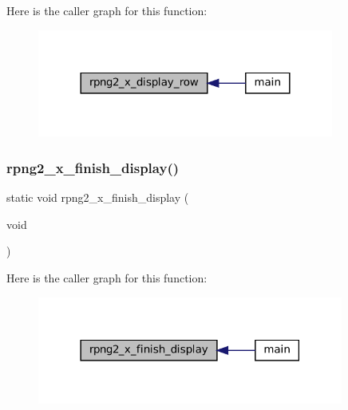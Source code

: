 Here is the caller graph for this function\+:
\nopagebreak
\begin{figure}[H]
\begin{center}
\leavevmode
\includegraphics[width=276pt]{rpng2-x_8c_a249f2f9baf0276621e94b788cd6d34c3_icgraph}
\end{center}
\end{figure}
\mbox{\label{rpng2-x_8c_ab1a527797f2c8d50003040e0af0b0fc9}} 
\subsubsection{\texorpdfstring{rpng2\+\_\+x\+\_\+finish\+\_\+display()}{rpng2\_x\_finish\_display()}}
{\footnotesize\ttfamily static void rpng2\+\_\+x\+\_\+finish\+\_\+display (\begin{DoxyParamCaption}\item[{void}]{ }\end{DoxyParamCaption})\hspace{0.3cm}{\ttfamily [static]}}

Here is the caller graph for this function\+:
\nopagebreak
\begin{figure}[H]
\begin{center}
\leavevmode
\includegraphics[width=285pt]{rpng2-x_8c_ab1a527797f2c8d50003040e0af0b0fc9_icgraph}
\end{center}
\end{figure}
\mbox{\label{rpng2-x_8c_ab20ab6bc14c0853af2e0e7698125174e}} 
